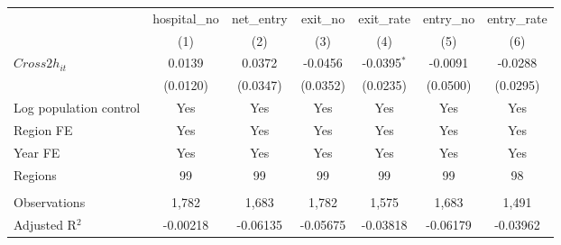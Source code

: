 \begingroup
\centering
\begin{tabular}{lcccccc}
   \toprule
                          & hospital\_no  & net\_entry  & exit\_no  & exit\_rate    & entry\_no  & entry\_rate \\    
                          & (1)           & (2)         & (3)       & (4)           & (5)        & (6)\\  
   \midrule 
   $Cross2h_{it}$         & 0.0139        & 0.0372      & -0.0456   & -0.0395$^{*}$ & -0.0091    & -0.0288\\   
                          & (0.0120)      & (0.0347)    & (0.0352)  & (0.0235)      & (0.0500)   & (0.0295)\\   
   Log population control & Yes           & Yes         & Yes       & Yes           & Yes        & Yes\\  
   Region FE              & Yes           & Yes         & Yes       & Yes           & Yes        & Yes\\  
   Year FE                & Yes           & Yes         & Yes       & Yes           & Yes        & Yes\\  
   Regions                & 99            & 99          & 99        & 99            & 99         & 98\\  
    \\
   Observations           & 1,782         & 1,683       & 1,782     & 1,575         & 1,683      & 1,491\\  
   Adjusted R$^2$         & -0.00218      & -0.06135    & -0.05675  & -0.03818      & -0.06179   & -0.03962\\  
   \bottomrule
\end{tabular}
\par\endgroup
